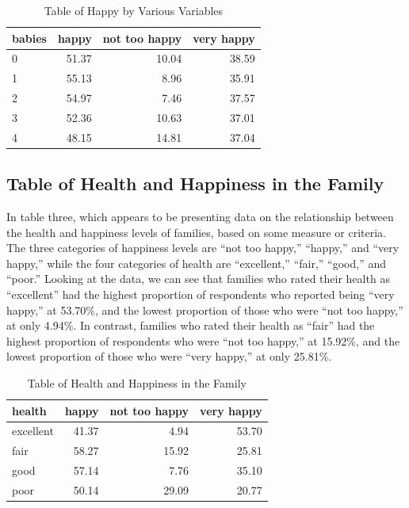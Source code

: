 \documentclass[
  letterpaper,
  DIV=11,
  numbers=noendperiod]{scrartcl}
\begin{document}
\begin{table}

\caption{Table of Happy by Various Variables}
\centering
\begin{tabular}[t]{l|r|r|r}
\hline
babies & happy & not too happy & very happy\\
\hline
0 & 51.37 & 10.04 & 38.59\\
\hline
1 & 55.13 & 8.96 & 35.91\\
\hline
2 & 54.97 & 7.46 & 37.57\\
\hline
3 & 52.36 & 10.63 & 37.01\\
\hline
4 & 48.15 & 14.81 & 37.04\\
\hline
\end{tabular}
\end{table}

\hypertarget{table-of-health-and-happiness-in-the-family}{%
\subsection{Table of Health and Happiness in the
Family}\label{table-of-health-and-happiness-in-the-family}}

In table three, which appears to be presenting data on the relationship
between the health and happiness levels of families, based on some
measure or criteria. The three categories of happiness levels are ``not
too happy,'' ``happy,'' and ``very happy,'' while the four categories of
health are ``excellent,'' ``fair,'' ``good,'' and ``poor.'' Looking at
the data, we can see that families who rated their health as
``excellent'' had the highest proportion of respondents who reported
being ``very happy,'' at 53.70\%, and the lowest proportion of those who
were ``not too happy,'' at only 4.94\%. In contrast, families who rated
their health as ``fair'' had the highest proportion of respondents who
were ``not too happy,'' at 15.92\%, and the lowest proportion of those
who were ``very happy,'' at only 25.81\%.

\begin{table}

\caption{Table of Health and Happiness in the Family}
\centering
\begin{tabular}[t]{l|r|r|r}
\hline
health & happy & not too happy & very happy\\
\hline
excellent & 41.37 & 4.94 & 53.70\\
\hline
fair & 58.27 & 15.92 & 25.81\\
\hline
good & 57.14 & 7.76 & 35.10\\
\hline
poor & 50.14 & 29.09 & 20.77\\
\hline
\end{tabular}
\end{table}
\end{document}
